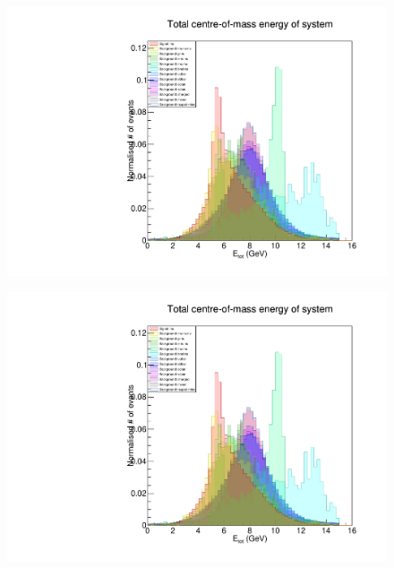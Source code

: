 \documentclass[12pt,a4paper]{article} %
\begin{document}
\begin{figure}[h]
\centering
\begin{minipage}{.5\textwidth}
  \centering
  \includegraphics[width=\linewidth]{images/stack/stack_cut6_totalCM_E.pdf}
  \label{fig:test1}
\end{minipage}%
\begin{minipage}{.5\textwidth}
  \centering
  \includegraphics[width=\linewidth]{images/stack/stack_cut6_totalCM_E.pdf}
  \label{fig:test2}
\end{minipage}
\end{figure}
\end{document}
